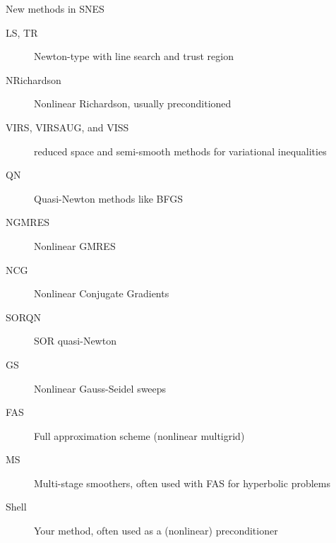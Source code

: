 \begin{frame}{New methods in SNES}
  \begin{description}
  \item[LS, TR] Newton-type with line search and trust region
  \item[NRichardson] Nonlinear Richardson, usually preconditioned
  \item[VIRS, VIRSAUG, and VISS] reduced space and semi-smooth methods for variational inequalities
  \item[QN] Quasi-Newton methods like BFGS
  \item[NGMRES] Nonlinear GMRES
  \item[NCG] Nonlinear Conjugate Gradients
  \item[SORQN] SOR quasi-Newton
  \item[GS] Nonlinear Gauss-Seidel sweeps
  \item[FAS] Full approximation scheme (nonlinear multigrid)
  \item[MS] Multi-stage smoothers, often used with FAS for hyperbolic problems
  \item[Shell] Your method, often used as a (nonlinear) preconditioner
  \end{description}
\end{frame}
